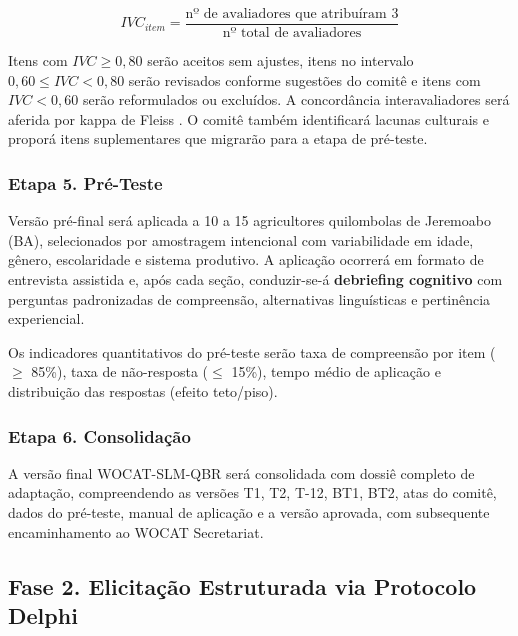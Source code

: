 \documentclass[3p,times]{elsarticle}
\begin{document}
\begin{equation}
IVC_{item} = \frac{\text{nº de avaliadores que atribuíram 3}}{\text{nº total de avaliadores}}
\label{eq:cvi}
\end{equation}

Itens com $IVC \geq 0,80$ serão aceitos sem ajustes, itens no intervalo $0,60 \leq IVC < 0,80$ serão revisados conforme sugestões do comitê e itens com $IVC < 0,60$ serão reformulados ou excluídos. A concordância interavaliadores será aferida por kappa de Fleiss \citep{Fleiss1971}. O comitê também identificará lacunas culturais e proporá itens suplementares que migrarão para a etapa de pré-teste.

\subsubsection{Etapa 5. Pré-Teste}

Versão pré-final será aplicada a 10 a 15 agricultores quilombolas de Jeremoabo (BA), selecionados por amostragem intencional com variabilidade em idade, gênero, escolaridade e sistema produtivo. A aplicação ocorrerá em formato de entrevista assistida e, após cada seção, conduzir-se-á \textbf{debriefing cognitivo} \citep{Willis2005} com perguntas padronizadas de compreensão, alternativas linguísticas e pertinência experiencial.

Os indicadores quantitativos do pré-teste serão taxa de compreensão por item ($\geq$ 85\%), taxa de não-resposta ($\leq$ 15\%), tempo médio de aplicação e distribuição das respostas (efeito teto/piso).

\subsubsection{Etapa 6. Consolidação}

A versão final WOCAT-SLM-QBR será consolidada com dossiê completo de adaptação, compreendendo as versões T1, T2, T-12, BT1, BT2, atas do comitê, dados do pré-teste, manual de aplicação e a versão aprovada, com subsequente encaminhamento ao WOCAT Secretariat.

\subsection{Fase 2. Elicitação Estruturada via Protocolo Delphi}
\end{document}
